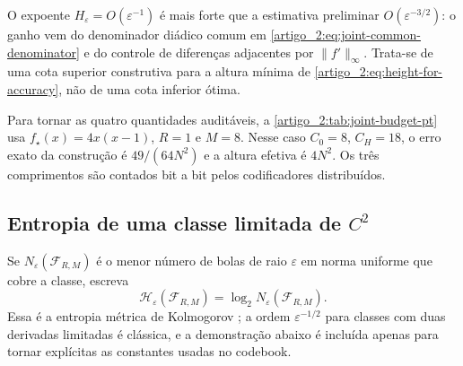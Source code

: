 O expoente $H_\varepsilon=O(\varepsilon^{-1})$ é mais forte que a estimativa
preliminar $O(\varepsilon^{-3/2})$: o ganho vem do denominador diádico comum
em \eqref{artigo_2:eq:joint-common-denominator} e do controle de diferenças adjacentes
por $\|f'\|_\infty$. Trata-se de uma cota superior construtiva para a altura
mínima de \eqref{artigo_2:eq:height-for-accuracy}, não de uma cota inferior ótima.

Para tornar as quatro quantidades auditáveis, a
\cref{artigo_2:tab:joint-budget-pt} usa $f_\star(x)=4x(x-1)$, $R=1$ e $M=8$. Nesse
caso $C_0=8$, $C_H=18$, o erro exato da construção é
$49/(64N^2)$ e a altura efetiva é $4N^2$. Os três comprimentos são contados
bit a bit pelos codificadores distribuídos.

\begin{table}[t]
\centering
\small
{}
\caption{Construção do \cref{artigo_2:thm:joint-budget} para
$f_\star(x)=4x(x-1)$. $e_{\rm cert}$ é a cota
\eqref{artigo_2:eq:joint-dyadic-error}, $e_{\rm exato}$ é obtido em aritmética
racional nos extremos e no ponto crítico de cada folha, e $H_N=18N^2$ é a
cota provada.}
\label{artigo_2:tab:joint-budget-pt}
\end{table}

\subsection{Entropia de uma classe limitada de \texorpdfstring{$C^2$}{C2}}

Se $N_\varepsilon(\mathcal{F}_{R,M})$ é o menor número de bolas de raio $\varepsilon$ em norma uniforme que cobre a classe, escreva
\[
 \mathcal{H}_\varepsilon(\mathcal{F}_{R,M})=\log_2N_\varepsilon(\mathcal{F}_{R,M}).
\]
Essa é a entropia métrica de Kolmogorov \citep{artigo_1-kolmogorov1959,artigo_1-lorentz1996}; a ordem $\varepsilon^{-1/2}$ para classes com duas derivadas limitadas é clássica, e a demonstração abaixo é incluída apenas para tornar explícitas as constantes usadas no codebook.

